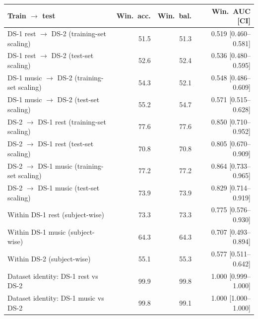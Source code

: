 \scriptsize
\begin{tabular}{lrrr}
\hline
Train $\rightarrow$ test & Win.\ acc. & Win.\ bal. & Win.\ AUC [CI] \\
\hline
DS-1 rest $\rightarrow$ DS-2 (training-set scaling) & 51.5 & 51.3 & 0.519 [0.460--0.581] \\
DS-1 rest $\rightarrow$ DS-2 (test-set scaling) & 52.6 & 52.4 & 0.536 [0.480--0.595] \\
DS-1 music $\rightarrow$ DS-2 (training-set scaling) & 54.3 & 52.1 & 0.548 [0.486--0.609] \\
DS-1 music $\rightarrow$ DS-2 (test-set scaling) & 55.2 & 54.7 & 0.571 [0.515--0.628] \\
DS-2 $\rightarrow$ DS-1 rest (training-set scaling) & 77.6 & 77.6 & 0.850 [0.710--0.952] \\
DS-2 $\rightarrow$ DS-1 rest (test-set scaling) & 70.8 & 70.8 & 0.805 [0.670--0.909] \\
DS-2 $\rightarrow$ DS-1 music (training-set scaling) & 77.2 & 77.2 & 0.864 [0.733--0.965] \\
DS-2 $\rightarrow$ DS-1 music (test-set scaling) & 73.9 & 73.9 & 0.829 [0.714--0.919] \\
Within DS-1 rest (subject-wise) & 73.3 & 73.3 & 0.775 [0.576--0.930] \\
Within DS-1 music (subject-wise) & 64.3 & 64.3 & 0.707 [0.493--0.894] \\
Within DS-2 (subject-wise) & 55.1 & 55.3 & 0.577 [0.511--0.642] \\
Dataset identity: DS-1 rest vs DS-2 & 99.9 & 99.8 & 1.000 [0.999--1.000] \\
Dataset identity: DS-1 music vs DS-2 & 99.8 & 99.1 & 1.000 [1.000--1.000] \\
\hline
\end{tabular}
